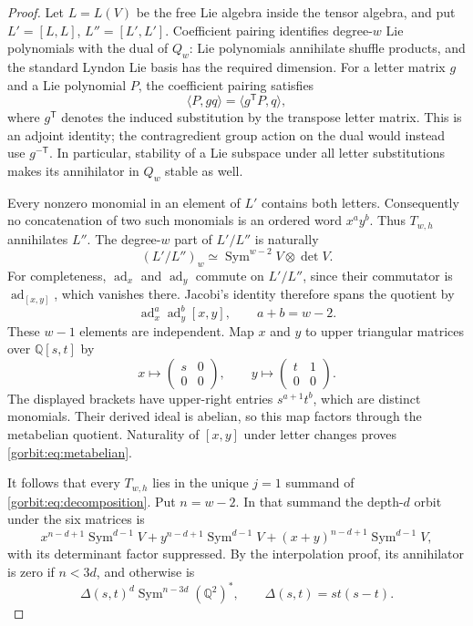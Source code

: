 \begin{proof}
Let $L=L(V)$ be the free Lie algebra inside the tensor algebra, and put
$L'=[L,L]$, $L''=[L',L']$. Coefficient pairing identifies degree-$w$
Lie polynomials with the dual of $Q_w$: Lie polynomials annihilate
shuffle products, and the standard Lyndon Lie basis has the required
dimension.
For a letter matrix $g$ and a Lie polynomial $P$, the coefficient
pairing satisfies
\[
 \langle P,gq\rangle=\langle g^{\mathsf T}P,q\rangle,
\]
where $g^{\mathsf T}$ denotes the induced substitution by the transpose
letter matrix. This is an adjoint identity; the contragredient group
action on the dual would instead use $g^{-\mathsf T}$. In particular,
stability of a Lie subspace under all letter substitutions makes its
annihilator in $Q_w$ stable as well.

Every nonzero monomial in an element of $L'$ contains both letters.
Consequently no concatenation of two such monomials is an ordered word
$x^a y^b$. Thus $T_{w,h}$ annihilates $L''$. The degree-$w$ part of
$L'/L''$ is naturally
\begin{equation}\label{gorbit:eq:metabelian}
 (L'/L'')_w\simeq\operatorname{Sym}^{w-2}V\otimes\det V.
\end{equation}
For completeness, $\operatorname{ad}_x$ and $\operatorname{ad}_y$
commute on $L'/L''$, since their commutator is
$\operatorname{ad}_{[x,y]}$, which vanishes there. Jacobi's identity
therefore spans the quotient by
\[
 \operatorname{ad}_x^a\operatorname{ad}_y^b[x,y],\qquad a+b=w-2.
\]
These $w-1$ elements are independent. Map $x$ and $y$ to upper
triangular matrices over $\mathbb Q[s,t]$ by
\[
 x\longmapsto\begin{pmatrix}s&0\\0&0\end{pmatrix},\qquad
 y\longmapsto\begin{pmatrix}t&1\\0&0\end{pmatrix}.
\]
The displayed brackets have upper-right entries $s^{a+1}t^b$, which
are distinct monomials. Their derived ideal is abelian, so this map
factors through the metabelian quotient. Naturality of $[x,y]$ under
letter changes proves \eqref{gorbit:eq:metabelian}.

It follows that every $T_{w,h}$ lies in the unique $j=1$ summand of
\eqref{gorbit:eq:decomposition}. Put $n=w-2$. In that summand the
depth-$d$ orbit under the six matrices is
\[
 x^{n-d+1}\operatorname{Sym}^{d-1}V
 +y^{n-d+1}\operatorname{Sym}^{d-1}V
 +(x+y)^{n-d+1}\operatorname{Sym}^{d-1}V,
\]
with its determinant factor suppressed. By the interpolation proof,
its annihilator is zero if $n<3d$, and otherwise is
\begin{equation}\label{gorbit:eq:ann-height}
 \Delta(s,t)^d\operatorname{Sym}^{n-3d}(\mathbb Q^2)^*,
 \qquad \Delta(s,t)=st(s-t).
\end{equation}


\end{proof}
